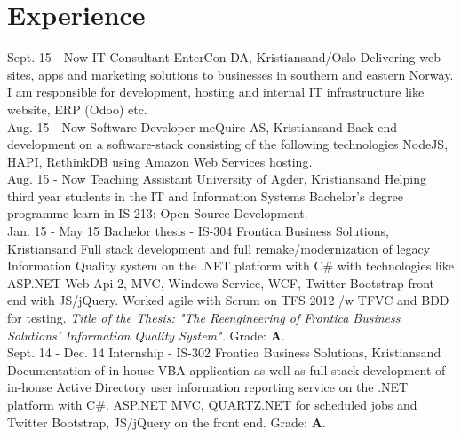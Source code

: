\documentclass[]{cv-class}
\begin{document}
\section{Experience}
\begin{entrylist}
  \entry
    {Sept. 15 - Now}
    {IT Consultant}
    {EnterCon DA, Kristiansand/Oslo}
    {Delivering web sites, apps and marketing solutions to businesses
    in southern and eastern Norway. I am responsible for development,
    hosting and internal IT infrastructure like website, ERP (Odoo) etc.\\}
  \entry
    {Aug. 15 - Now}
    {Software Developer}
    {meQuire AS, Kristiansand}
    {Back end development on a software-stack consisting of the following 
    technologies NodeJS, HAPI, RethinkDB using Amazon Web Services hosting.\\}
  \entry
    {Aug. 15 - Now}
    {Teaching Assistant}
    {University of Agder, Kristiansand}
    {Helping third year students in the IT and Information Systems Bachelor's degree programme
    learn in IS-213: Open Source Development.\\}
  \entry
    {Jan. 15 - May 15}
    {Bachelor thesis - IS-304}
    {Frontica Business Solutions, Kristiansand}
    {Full stack development and full remake/modernization of legacy Information Quality system
    on the .NET platform with C\# with technologies like ASP.NET Web Api 2,
    MVC, Windows Service, WCF, 
    Twitter Bootstrap front end with JS/jQuery. Worked agile with Scrum on TFS 2012 /w TFVC
    and BDD for testing.
    \emph{Title of the Thesis: 
    "The Reengineering of Frontica Business Solutions' Information Quality System".} 
    Grade: \textbf{A}.\\}
  \entry
    {Sept. 14 - Dec. 14}
    {Internship - IS-302}
    {Frontica Business Solutions, Kristiansand}
    {Documentation of in-house VBA application as well as full stack development of 
    in-house Active Directory
    user information reporting service on the .NET platform with C\#. ASP.NET MVC, 
    QUARTZ.NET for scheduled jobs
    and Twitter Bootstrap, JS/jQuery on the front end. Grade: \textbf{A}.\\}
\end{entrylist}
\end{document}
